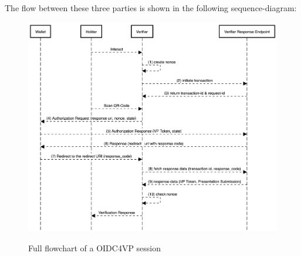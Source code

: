\documentclass[
	a4paper               %
	,BCOR=0mm            %
	,bibliography=totoc   %
	,listof=totoc         %
	,monolingual
	,twoside=false
]{bfhthesis}              %
\begin{document}
The flow between these three parties is shown in the following sequence-diagram:
\begin{figure}[h]
	\centering
	\includegraphics[width=12cm]{./img/oidc4vpflowextended.png}
	\label{fig:flowoid}
	\caption{Full flowchart of a OIDC4VP session}
\end{figure}
\end{document}
